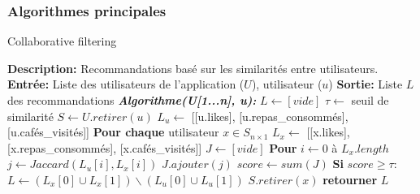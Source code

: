 \documentclass[11pt]{article}
\begin{document}
\subsubsection{Algorithmes principales}
\begin{algorithm}
    \caption{Collaborative filtering}
    \begin{algorithmic}[1]
        \Statex \textbf{Description:} Recommandations basé sur les similarités entre utilisateurs.
        \Statex \textbf{Entrée:} Liste des utilisateurs de l'application ($U$), utilisateur ($u$)
        \Statex \textbf{Sortie:} Liste $L$ des recommandations
        \State \textbf{\textit{Algorithme(U[1...n], u):}}
        \State \hspace{0.5cm} $L \leftarrow [vide]$
        \State \hspace{0.5cm} $\tau \leftarrow$ seuil de similarité 
        \State \hspace{0.5cm} $S \leftarrow U.retirer(u)$
        \State \hspace{0.5cm} $L_u \leftarrow$ [[u.likes], [u.repas\_consommés], [u.cafés\_visités]]
        \State \hspace{0.5cm} \textbf{Pour chaque} utilisateur $x\in S_{n\times 1}$
        \State \hspace{1cm} $L_x \leftarrow$ [[x.likes], [x.repas\_consommés], [x.cafés\_visités]]
        \State \hspace{1cm} $J \leftarrow [vide]$
        \State \hspace{1cm} \textbf{Pour} $i \leftarrow 0$ à $L_x.length$
        \State \hspace{1.5cm} $j \leftarrow Jaccard(L_u[i], L_x[i])$
        \State \hspace{1.5cm} $J.ajouter(j)$
        \State \hspace{1cm} $score \leftarrow sum(J)$
        \State \hspace{1cm} \textbf{Si} $score \geq \tau$:
        \State \hspace{1.5cm} $L \leftarrow (L_x[0] \cup L_x[1]) \backslash (L_u[0] \cup L_u[1])$
        \State \hspace{1cm} $S.retirer(x)$
        \State \hspace{0.5cm} \textbf{retourner} $L$
    \end{algorithmic}
\end{algorithm}
\end{document}

